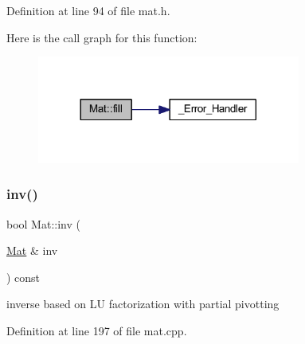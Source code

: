 Definition at line 94 of file mat.\+h.

Here is the call graph for this function\+:
\nopagebreak
\begin{figure}[H]
\begin{center}
\leavevmode
\includegraphics[width=245pt]{class_mat_af95f54284a8d4937918dadb347e76a13_cgraph}
\end{center}
\end{figure}
\mbox{\label{class_mat_a22ba19e51a04cbf9211b070b696ae399}} 
\subsubsection{\texorpdfstring{inv()}{inv()}\hspace{0.1cm}{\footnotesize\ttfamily [1/2]}}
{\footnotesize\ttfamily bool Mat\+::inv (\begin{DoxyParamCaption}\item[{\mbox{\hyperlink{class_mat}{Mat}} \&}]{inv }\end{DoxyParamCaption}) const}

inverse based on LU factorization with partial pivotting 

Definition at line 197 of file mat.\+cpp.

